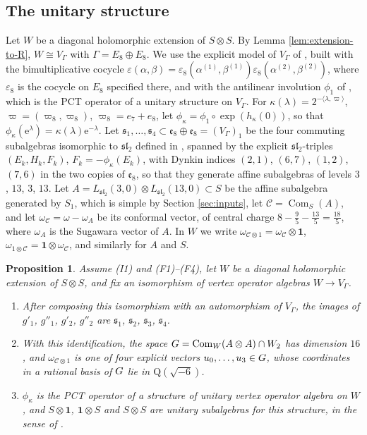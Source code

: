 \documentclass[leqno]{article}
\newcommand{\Q}{\mathrm{Q}}
\newcommand{\scr}{\mathscr}
\let\cal\relax
\newcommand{\cal}{\mathcal}
\newcommand{\la}{\langle}
\newcommand{\ra}{\rangle}
\newcommand{\ot}{\otimes}
\newcommand{\epsi}{\varepsilon}
\newcommand{\e}{\mathrm{e}}
\newtheorem{prop}[thm]{Proposition}
\numberwithin{equation}{section}
\begin{document}
\subsection{The unitary structure}
\label{subsec:unitary-structure}

Let $W$ be a diagonal holomorphic extension of $S \ot S$. By Lemma \ref{lem:extension-to-R}, $W \cong V_\Gamma$ with $\Gamma = E_8 \oplus E_8$. We use the explicit model of $V_\Gamma$ of \cite[Section 7.5]{ArhII}, built with the bimultiplicative cocycle $\epsi(\alpha,\beta) = \epsi_8(\alpha^{(1)},\beta^{(1)})\epsi_8(\alpha^{(2)},\beta^{(2)})$, where $\epsi_8$ is the cocycle on $E_8$ specified there, and with the antilinear involution $\phi_1$ of \cite[Theorem 4.12]{DoL14}, which is the PCT operator of a unitary structure on $V_\Gamma$. For $\kappa(\lambda) = 2^{-\la\lambda,\varpi\ra}$, $\varpi = (\varpi_8,\varpi_8)$, $\varpi_8 = e_7+e_8$, let $\phi_\kappa = \phi_1 \circ \exp(h_\kappa(0))$, so that $\phi_\kappa(\e^\lambda) = \kappa(\lambda)\e^{-\lambda}$. Let $\mathfrak s_1, \ldots, \mathfrak s_4 \subset \mathfrak e_8 \oplus \mathfrak e_8 = (V_\Gamma)_1$ be the four commuting subalgebras isomorphic to $\mathfrak{sl}_2$ defined in \cite[Section 7.5]{ArhII}, spanned by the explicit $\mathfrak{sl}_2$-triples $(E_k,H_k,F_k)$, $F_k = -\phi_\kappa(E_k)$, with Dynkin indices $(2,1)$, $(6,7)$, $(1,2)$, $(7,6)$ in the two copies of $\mathfrak e_8$, so that they generate affine subalgebras of levels $3$, $13$, $3$, $13$. Let $A = L_{\mathfrak{sl}_2}(3,0) \ot L_{\mathfrak{sl}_2}(13,0) \subset S$ be the affine subalgebra generated by $S_1$, which is simple by Section \ref{sec:inputs}, let $\scr C = \operatorname{Com}_S(A)$, and let $\omega_{\scr C} = \omega-\omega_A$ be its conformal vector, of central charge $8-\frac95-\frac{13}5 = \frac{18}5$, where $\omega_A$ is the Sugawara vector of $A$. In $W$ we write $\omega_{\scr C \ot 1} = \omega_{\scr C} \ot \mathbf 1$, $\omega_{1 \ot \scr C} = \mathbf 1 \ot \omega_{\scr C}$, and similarly for $A$ and $S$.

\begin{prop}
\label{prop:unitary-structure}
Assume \textup{(I1)} and \textup{(F1)}--\textup{(F4)}, let $W$ be a diagonal holomorphic extension of $S \ot S$, and fix an isomorphism of vertex operator algebras $W \to V_\Gamma$.
\begin{enumerate}
\item After composing this isomorphism with an automorphism of $V_\Gamma$, the images of $g'_1$, $g''_1$, $g'_2$, $g''_2$ are $\mathfrak s_1$, $\mathfrak s_2$, $\mathfrak s_3$, $\mathfrak s_4$.
\item With this identification, the space $\cal G = \operatorname{Com}_W(A \ot A) \cap W_2$ has dimension $16$, and $\omega_{\scr C \ot 1}$ is one of four explicit vectors $u_0, \ldots, u_3 \in \cal G$, whose coordinates in a rational basis of $\cal G$ lie in $\Q(\sqrt{-6})$.
\item $\phi_\kappa$ is the PCT operator of a structure of unitary vertex operator algebra on $W$, and $S \ot \mathbf 1$, $\mathbf 1 \ot S$ and $S \ot S$ are unitary subalgebras for this structure, in the sense of \cite[Definition 5.22 p.~43]{CKLW18}.
\end{enumerate}
\end{prop}
\end{document}
